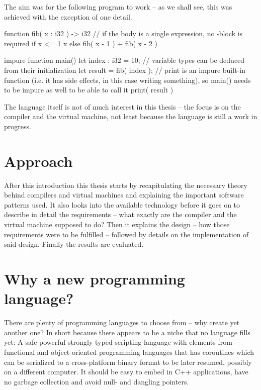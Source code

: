 	The aim was for the following program to work -- as we shall see, this was achieved with the exception of one detail.
	
	\begin{perseuslisting}[caption={Desired target language example},label={lst:target_language}]
function fib( x : i32 ) -> i32
    // if the body is a single expression, no {}-block is required
    if x <= 1
        x
    else
        fib( x - 1 ) + fib( x - 2 )

impure function main()
{
	let index : i32 = 10;
	// variable types can be deduced from their initialization
	let result = fib( index );
	// print is an impure built-in function (i.e. it has side effects, in this case writing something), so main() needs to be impure as well to be able to call it
	print( result )
}
	\end{perseuslisting}
	
	The language itself is not of much interest in this thesis -- the focus is on the compiler and the virtual machine, not least because the language is still a work in progress.
    
    
	\section{Approach} %
	
	After this introduction this thesis starts by recapitulating the necessary theory behind compilers and virtual machines and explaining the important software patterns used. It also looks into the available technology before it goes on to describe in detail the requirements -- what exactly are the compiler and the virtual machine supposed to do? Then it explains the design -- how those requirements were to be fulfilled -- followed by details on the implementation of said design. Finally the results are evaluated.
	
	
	\section{Why a new programming language?}
	
	There are plenty of programming languages to choose from -- why create yet another one? In short because there appears to be a niche that no language fills yet: A safe powerful strongly typed scripting language with elements from functional and object-oriented programming languages that has coroutines which can be serialized to a cross-platform binary format to be later resumed, possibly on a different computer. It should be easy to embed in C++ applications, have no garbage collection and avoid null- and dangling pointers.
	
